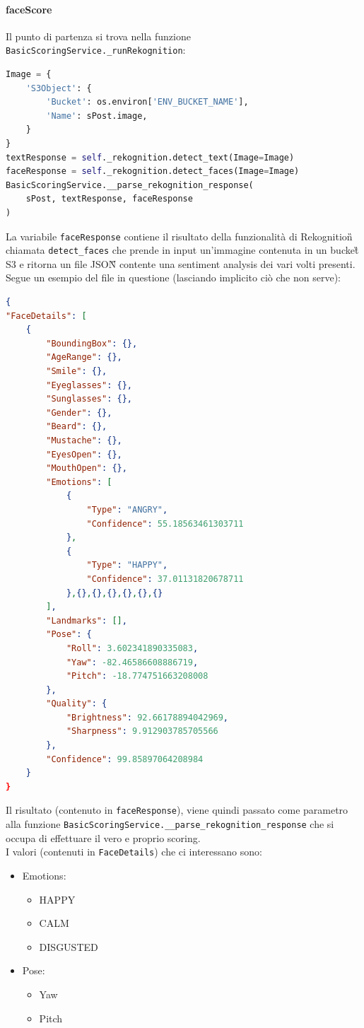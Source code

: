 \paragraph{faceScore} \aCapo
Il punto di partenza si trova nella funzione \verb+BasicScoringService._runRekognition+:
\begin{lstlisting}[language=Python]
Image = {
    'S3Object': {
        'Bucket': os.environ['ENV_BUCKET_NAME'],
        'Name': sPost.image,
    }
}
textResponse = self._rekognition.detect_text(Image=Image)
faceResponse = self._rekognition.detect_faces(Image=Image)
BasicScoringService.__parse_rekognition_response(
    sPost, textResponse, faceResponse
)
\end{lstlisting}
La variabile \verb+faceResponse+ contiene il risultato della funzionalità
di Rekognition\G{} chiamata \verb+detect_faces+ che prende in input un'immagine contenuta
in un bucket\G{} S3 e ritorna un file JSON\G{} contente una sentiment analysis dei vari volti presenti.\\
Segue un esempio del file in questione (lasciando implicito ciò che non serve):
\begin{lstlisting}[language=JSON]
{
"FaceDetails": [
    {
        "BoundingBox": {},
        "AgeRange": {},
        "Smile": {},
        "Eyeglasses": {},
        "Sunglasses": {},
        "Gender": {},
        "Beard": {},
        "Mustache": {},
        "EyesOpen": {},
        "MouthOpen": {},
        "Emotions": [
            {
                "Type": "ANGRY",
                "Confidence": 55.18563461303711
            },
            {
                "Type": "HAPPY",
                "Confidence": 37.01131820678711
            },{},{},{},{},{},{}
        ],
        "Landmarks": [],
        "Pose": {
            "Roll": 3.602341890335083,
            "Yaw": -82.46586608886719,
            "Pitch": -18.774751663208008
        },
        "Quality": {
            "Brightness": 92.66178894042969,
            "Sharpness": 9.912903785705566
        },
        "Confidence": 99.85897064208984
    }
}
\end{lstlisting}
Il risultato (contenuto in \verb+faceResponse+), viene quindi passato come parametro alla funzione 
\verb+BasicScoringService.__parse_rekognition_response+ che si occupa di effettuare il vero
e proprio scoring.\\
I valori (contenuti in \verb+FaceDetails+) che ci interessano sono:
\begin{itemize}
    \item Emotions: \begin{itemize}
        \item HAPPY
        \item CALM
        \item DISGUSTED \end{itemize}
    \item Pose: \begin{itemize}
        \item Yaw
        \item Pitch \end{itemize}
\end{itemize}
